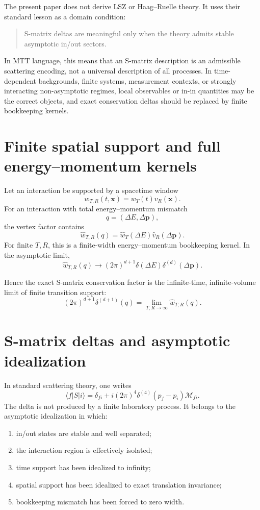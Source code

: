 \documentclass[11pt]{article}
\begin{document}
The present paper does not derive LSZ or Haag--Ruelle theory.  It uses their standard lesson as a domain condition:

\begin{quote}
S-matrix deltas are meaningful only when the theory admits stable asymptotic in/out sectors.
\end{quote}

In MTT language, this means that an S-matrix description is an admissible scattering encoding, not a universal description of all processes.  In time-dependent backgrounds, finite systems, measurement contexts, or strongly interacting non-asymptotic regimes, local observables or in-in quantities may be the correct objects, and exact conservation deltas should be replaced by finite bookkeeping kernels.


\section{Finite spatial support and full energy--momentum kernels}

Let an interaction be supported by a spacetime window
\[
w_{T,R}(t,\mathbf x)
=
w_T(t)v_R(\mathbf x).
\]
For an interaction with total energy--momentum mismatch
\[
q=(\Delta E,\Delta \mathbf p),
\]
the vertex factor contains
\[
\widehat w_{T,R}(q)
=
\widehat w_T(\Delta E)\widehat v_R(\Delta \mathbf p).
\]
For finite \(T,R\), this is a finite-width energy--momentum bookkeeping kernel.  In the asymptotic limit,
\[
\widehat w_{T,R}(q)
\to
(2\pi)^{d+1}\delta(\Delta E)\delta^{(d)}(\Delta\mathbf p).
\]

Hence the exact S-matrix conservation factor is the infinite-time, infinite-volume limit of finite transition support:
\[
(2\pi)^{d+1}\delta^{(d+1)}(q)
=
\lim_{T,R\to\infty}\widehat w_{T,R}(q).
\]

\section{S-matrix deltas and asymptotic idealization}

In standard scattering theory, one writes
\[
\langle f|S|i\rangle
=
\delta_{fi}
+
i(2\pi)^4\delta^{(4)}(p_f-p_i)\mathcal M_{fi}.
\]
The delta is not produced by a finite laboratory process.  It belongs to the asymptotic idealization in which:

\begin{enumerate}
\item in/out states are stable and well separated;
\item the interaction region is effectively isolated;
\item time support has been idealized to infinity;
\item spatial support has been idealized to exact translation invariance;
\item bookkeeping mismatch has been forced to zero width.
\end{enumerate}
\end{document}
